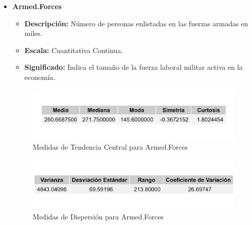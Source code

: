 \documentclass{article}
\begin{document}
\begin{itemize}
    \item \textbf{Armed.Forces}
    \begin{itemize}
        \item \textbf{Descripción:} Número de personas enlistadas en las fuerzas armadas en miles.
        \item \textbf{Escala:} Cuantitativa Continua.
        \item \textbf{Significado:} Indica el tamaño de la fuerza laboral militar activa en la economía.
    \end{itemize}
    \begin{figure}[H]
        \centering
        \includegraphics[width=\textwidth]{MTC/Armed.Forces_central.png}
        \caption{Medidas de Tendencia Central para Armed.Forces}
    \end{figure}
    \begin{figure}[H]
        \centering
        \includegraphics[width=\textwidth]{MTC/Armed.Forces_dispersion.png}
        \caption{Medidas de Dispersión para Armed.Forces}
    \end{figure}
    

\end{itemize}
\end{document}

